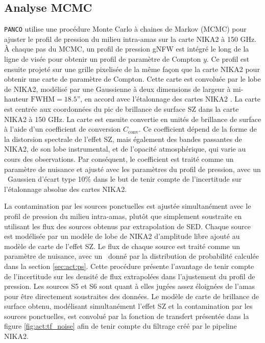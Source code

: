 \subsection{Analyse MCMC}

\texttt{PANCO} utilise une procédure Monte Carlo à chaines de Markov (MCMC) pour ajuster le profil de pression du milieu intra-amas sur la carte NIKA2 à 150 GHz.
À chaque pas du MCMC, un profil de pression gNFW est intégré le long de la ligne de visée pour obtenir un profil de paramètre de Compton $y$.
Ce profil est ensuite projeté sur une grille pixelisée de la même façon que la carte NIKA2 pour obtenir une carte de paramètre de Compton.
Cette carte est convoluée par le lobe de NIKA2, modélisé par une Gaussienne à deux dimensions de largeur à mi-hauteur $\mathrm{FWHM=18.5}$'', en accord avec l'étalonnage des cartes NIKA2 \cite{perotto_calibration_2020}.
La carte est centrée aux coordonnées du pic de brillance de surface SZ dans la carte NIKA2 à 150 GHz.
%
La carte est ensuite convertie en unités de brillance de surface à l'aide d'un coefficient de conversion $C_\mathrm{conv}$.
Ce coefficient dépend de la forme de la distorsion spectrale de l'effet SZ, mais également des bandes passantes de NIKA2, de son lobe instrumental, et de l'opacité atmosphérique, qui varie au cours des observations.
Par conséquent, le coefficient est traité comme un paramètre de nuisance et ajusté avec les paramètres du profil de pression, avec un \prior\ Gaussien d'écart type 10\% dans le but de tenir compte de l'incertitude sur l'étalonnage absolue des cartes NIKA2.

La contamination par les sources ponctuelles est ajustée simultanément avec le profil de pression du milieu intra-amas, plutôt que simplement soustraite en utilisant les flux des sources obtenus par extrapolation de SED.
Chaque source est modélisée par un modèle de lobe de NIKA2 d'amplitude libre ajouté au modèle de carte de l'effet SZ.
Le flux de chaque source est traité comme un paramètre de nuisance, avec un \prior\ donné par la distribution de probabilité calculée dans la section \ref{sec:act:ps}.
Cette procédure présente l'avantage de tenir compte de l'incertitude sur les densité de flux extrapolées dans l'ajustement du profil de pression.
Les sources S5 et S6 sont quant à elles jugées assez éloignées de l'amas pour être directement soustraites des données.
Le modèle de carte de brillance de surface obtenu, modélisant simultanément l'effet SZ et la contamination par les sources ponctuelles, est convolué par la fonction de transfert présentée dans la figure \ref{fig:act:tf_noise} afin de tenir compte du filtrage créé par le pipeline NIKA2.


